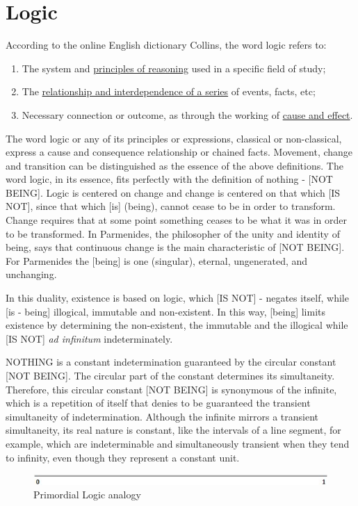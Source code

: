 \section{Logic}
According to the online English dictionary Collins\cite{dic_logic}, the word logic refers to:
	\begin{enumerate}
	   \item The system and \underline{principles of reasoning} used in a specific field of study;
	   \item The \underline{relationship and interdependence of a series} of events, facts, etc; 
	   \item Necessary connection or outcome, as through the working of \underline{cause and effect}. 
	\end{enumerate}
 
\bigbreak
The word logic or any of its principles or expressions, classical or non-classical, express a cause and consequence relationship or chained facts. Movement, change and transition can be distinguished as the essence of the above definitions. The word logic, in its essence, fits perfectly with the definition of nothing - [NOT BEING].  Logic is centered on change and change is centered on that which [IS NOT], since that which [is] (being), cannot cease to be in order to transform. Change requires that at some point something ceases to be what it was in order to be transformed. In  Parmenides, the philosopher of the unity and identity of being, says that continuous change is the main characteristic of [NOT BEING]. For Parmenides the [being] is one (singular), eternal, ungenerated, and unchanging.

In this duality, existence is based on logic, which [IS NOT] - negates itself, while [is - being] illogical, immutable and non-existent. In this way, [being] limits existence by determining the non-existent, the immutable and the illogical while [IS NOT] \textit{ad infinitum} indeterminately.

NOTHING is a constant indetermination guaranteed by the circular constant [NOT BEING]. The circular part of the constant determines its simultaneity. Therefore, this circular constant [NOT BEING] is synonymous of the infinite, which is a repetition of itself that denies to be guaranteed the transient simultaneity of indetermination. Although the infinite mirrors a transient simultaneity, its real nature is constant, like the intervals of a line segment, for example, which are indeterminable and simultaneously transient when they tend to infinity, even though they represent a constant unit.	
	\begin{figure}[H]
	\caption{Primordial Logic analogy}
	\label{fig:primordial_logic_representation}
	\centering
	\includegraphics[scale=.9]{sections/images/primordial_logic_representation.jpg}
	\end{figure}

